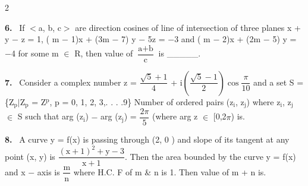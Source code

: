 \documentclass[10pt]{extarticle}
\newcommand{\qn}[1]{\par\smallskip\noindent\textbf{#1.}~}
\begin{document}
\begin{multicols}{2}
\qn{6} If $<$a, b, c$>$ are direction cosines of line of intersection of three planes x + y $-$ z = 1, ( m $-$ 1)x + (3m $-$ 7) y $-$ 5z = $-$3 and ( m $-$ 2)x + (2m $-$ 5) y = $-$4 for some m $\in$ R, then value of $\dfrac{\text{a}+\text{b}}{\text{c}}$ is \_\_\_\_\_.
\qn{7} Consider a complex number z = $\dfrac{\sqrt{5}+1}{4}$ + i$\left(\dfrac{\sqrt{5}-1}{2}\right)\cos\dfrac{\pi}{10}$ and a set S = \{Z$_\text{p}$$|$Z$_\text{p}$ = Z$^\text{p}$, p = 0, 1, 2, 3,. . . .9\} Number of ordered pairs (z$_\text{i}$, z$_\text{j}$) where z$_\text{i}$, z$_\text{j}$ $\in$ S such that arg (z$_\text{i}$) $-$ arg (z$_\text{j}$) = $\dfrac{2\pi}{5}$ (where arg z $\in$ [0,2$\pi$) is.
\qn{8} A curve y = f(x) is passing through (2, 0 ) and slope of its tangent at any point (x, y) is $\dfrac{(\text{x}+1)^2 + \text{y} - 3}{\text{x}+1}$. Then the area bounded by the curve y = f(x) and x $-$ axis is $\dfrac{\text{m}}{\text{n}}$ where H.C. F of m \& n is 1. Then value of m + n is.
\end{multicols}
\end{document}
